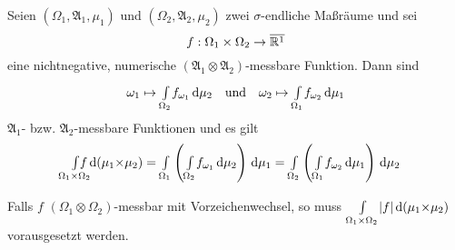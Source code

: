 \documentclass{cheat-sheet}
\newcommand{\Alg}{\mathfrak{A}} %
\renewcommand{\P}{\mathbb{P}} %
\newcommand{\E}{\mathbb{E}} %
\newcommand{\Leb}{\mathcal{L}} %
\renewcommand{\ER}{\overline{\R^1}} %
\begin{document}
\begin{satz}
  Seien $(\Omega_1, \Alg_1, \mu_1)$ und $(\Omega_2, \Alg_2, \mu_2)$ zwei $\sigma$-endliche Maßräume und sei
  \[ f : \Omega_1 \times \Omega_2 \to \ER \]
  eine nichtnegative, numerische $(\Alg_1 {\otimes} \Alg_2)$-messbare Funktion. Dann sind
  \begin{align*}
    \omega_1 \mapsto {\textstyle \int\limits_{\Omega_2}^{}} f_{\omega_1} \,\mathrm{d} \mu_2
    \quad \text{und} \quad
    \omega_2 \mapsto {\textstyle \int\limits_{\Omega_1}^{}} f_{\omega_2} \,\mathrm{d} \mu_1
  \end{align*}
  $\Alg_1$- bzw. $\Alg_2$-messbare Funktionen und es gilt
  \[
    \Int{\mathclap{\Omega_1 \times \Omega_2}}{}{f}{(\mu_1 {\times} \mu_2)} =
    \Int{\Omega_1}{}{\left( \Int{\Omega_2}{}{f_{\omega_1}}{\mu_2} \right)}{\mu_1} = 
    \Int{\Omega_2}{}{\left( \Int{\Omega_1}{}{f_{\omega_2}}{\mu_1} \right)}{\mu_2}
  \]
\end{satz}

\begin{bem}
  Falls $f$ $(\Omega_1 {\otimes} \Omega_2)$-messbar mit Vorzeichenwechsel, so muss ${\textstyle \int\limits_{\Omega_1 {\times} \Omega_2}^{}} \lvert f\rvert \,\mathrm{d} (\mu_1 {\times} \mu_2)$ vorausgesetzt werden.
\end{bem}


\iffalse
  $\Omega_1 = \Omega_2 = \left[ 0, 1 \right]$, $\mu_1 = \mu_2 = \lambda_1$
  \begin{itemize}
    \item $f(x, y) \coloneqq \tfrac{x^2 - y^2}{(x^2 + y^2)^2}$
    \item $f(x, y) \coloneqq \begin{cases} (x - \tfrac{1}{2})^{-3} & \text{für } 0 < y < \abs{x - \tfrac{1}{2}} \\ 0, & \text{sonst}$
    \item $f(x, y) \coloneqq \tfrac{x-y}{(x^2 + y^2)^\tfrac{3}{2}}$
    \item $f(x, y) \coloneqq \tfrac{1}{(1-xy)^p}$ mit $p > 0$
  \end{itemize}

  Beispiel: Gaußsches weißes Rauschen

  Sei $T = \left[ 0, 1 \right]$, $(X_t)_{t \in T}$ eine Familie unabhängiger, $N(0, 1)$-vertielter ZGn über eiem W-Raum $(\Omega, \Alg, \P)$.

  Produktraum: $(T \times \Omega, \Leb(T) \otimes \Alg, \lambda_1 \times \P)$

  Problem: $\Int{T}{}{\Int{T}{}{\E X_s X_t}{s}}{t} = \lambda_2(\Set{ (s, s) }{ s \in T }) = 0$
\fi
\end{document}
